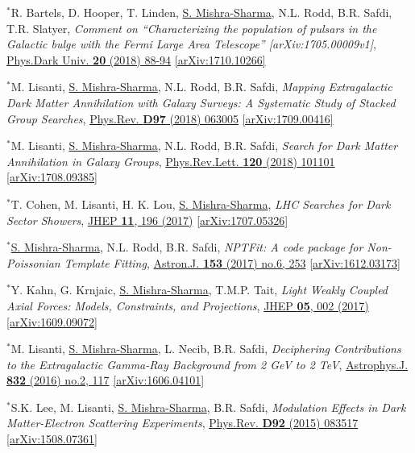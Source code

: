 \documentclass[letterpaper,11pt]{article}
\newenvironment{packed_enumerate}[1][]{
\begin{etaremune}[#1]
  \setlength{\itemsep}{4.0pt}
  \setlength{\parskip}{0pt}
  \setlength{\parsep}{0pt}}{\end{etaremune}
}
\begin{document}
\begin{packed_enumerate}[start=63]
  \item $^*$R. Bartels, D. Hooper, T. Linden, \underline{S. Mishra-Sharma}, N.L. Rodd, B.R. Safdi, T.R. Slatyer, \emph{Comment on ``Characterizing the population of pulsars in the Galactic bulge with the
  {\it Fermi} Large Area Telescope'' [arXiv:1705.00009\MakeLowercase{v}1]}, \href{https://www.sciencedirect.com/science/article/pii/S2212686418300268}{Phys.Dark Univ. \textbf{20} (2018) 88-94} \href{https://arxiv.org/abs/1710.10266}{[arXiv:1710.10266]}
  \item $^*$M. Lisanti, \underline{S. Mishra-Sharma}, N.L. Rodd, B.R. Safdi, \emph{Mapping Extragalactic Dark Matter Annihilation with Galaxy Surveys: A Systematic Study of Stacked Group Searches},  \href{https://journals.aps.org/prd/abstract/10.1103/PhysRevD.97.063005}{Phys.Rev. \textbf{D97} (2018) 063005} \href{https://arxiv.org/abs/1709.00416}{[arXiv:1709.00416]}
  \item $^*$M. Lisanti, \underline{S. Mishra-Sharma}, N.L. Rodd, B.R. Safdi, \emph{Search for Dark Matter Annihilation in Galaxy Groups},  \href{https://journals.aps.org/prl/abstract/10.1103/PhysRevLett.120.101101}{Phys.Rev.Lett. \textbf{120} (2018) 101101} \href{https://arxiv.org/abs/1708.09385}{[arXiv:1708.09385]}
  \item $^*$T. Cohen, M. Lisanti, H. K. Lou, \underline{S. Mishra-Sharma}, \emph{LHC Searches for Dark Sector Showers},  \href{https://link.springer.com/article/10.1007/JHEP11(2017)196}{JHEP \textbf{11}, 196 (2017)} \href{https://arxiv.org/abs/1707.05326}{ [arXiv:1707.05326]}
  \item $^*$\underline{S. Mishra-Sharma}, N.L. Rodd, B.R. Safdi, \emph{NPTFit: A code package for Non-Poissonian Template Fitting},  \href{http://iopscience.iop.org/article/10.3847/1538-3881/aa6d5f/meta}{Astron.J. \textbf{153} (2017) no.6, 253} \href{https://arxiv.org/abs/1612.03173}{ [arXiv:1612.03173]}
  \item $^*$Y. Kahn, G. Krnjaic, \underline{S. Mishra-Sharma}, T.M.P. Tait, \emph{Light Weakly Coupled Axial Forces: Models, Constraints, and Projections},  \href{https://link.springer.com/article/10.1007%2FJHEP05%282017%29002}{JHEP \textbf{05}, 002 (2017)} \href{https://arxiv.org/abs/1609.09072}{[arXiv:1609.09072]}
  \item $^*$M. Lisanti, \underline{S. Mishra-Sharma}, L. Necib, B.R. Safdi, \emph{Deciphering Contributions to the Extragalactic Gamma-Ray Background from 2 GeV to 2 TeV},  \href{http://iopscience.iop.org/article/10.3847/0004-637X/832/2/117/meta}{Astrophys.J. \textbf{832} (2016) no.2, 117} \href{https://arxiv.org/abs/1606.04101}{[arXiv:1606.04101]}
  \item $^*$S.K. Lee, M. Lisanti, \underline{S. Mishra-Sharma}, B.R. Safdi, \emph{Modulation Effects in Dark Matter-Electron Scattering Experiments}, \href{https://journals.aps.org/prd/abstract/10.1103/PhysRevD.92.083517}{Phys.Rev. \textbf{D92} (2015) 083517} \href{https://arxiv.org/abs/1508.07361}{[arXiv:1508.07361]}
\end{packed_enumerate}
\end{document}
